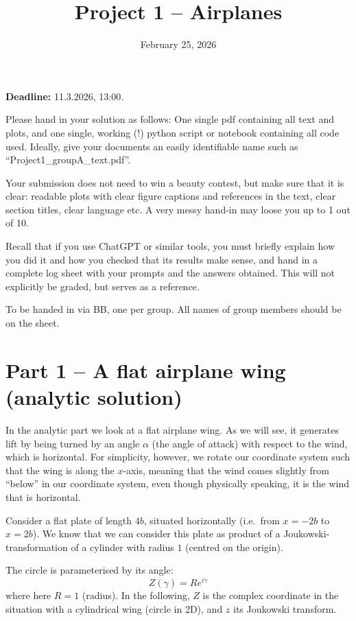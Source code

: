 \documentclass[11pt,a4paper]{article}
\title{Project 1 -- Airplanes}
\date{February 25, 2026}
\begin{document}
\maketitle

\noindent
\textbf{Deadline:} 11.3.2026, 13:00.

\vspace{0.5em}

Please hand in your solution as follows: One single pdf containing all text and plots, and one single, working (!)
python script or notebook containing all code used. Ideally, give your documents an easily identifiable name such as
``Project1\_groupA\_text.pdf''.

Your submission does not need to win a beauty contest, but make sure that it is clear:
readable plots with clear figure captions and references in the text, clear section titles, clear language etc.
A very messy hand-in may loose you up to 1 out of 10.

Recall that if you use ChatGPT or similar tools, you must briefly explain how you did it and how you checked that its
results make sense, and hand in a complete log sheet with your prompts and the answers obtained.
This will not explicitly be graded, but serves as a reference.

To be handed in via BB, one per group. All names of group members should be on the sheet.

\section*{Part 1 -- A flat airplane wing (analytic solution)}

In the analytic part we look at a flat airplane wing. As we will see, it generates lift by being turned by an angle $\alpha$
(the angle of attack) with respect to the wind, which is horizontal. For simplicity, however, we rotate our coordinate
system such that the wing is along the $x$-axis, meaning that the wind comes slightly from ``below'' in our coordinate
system, even though physically speaking, it is the wind that is horizontal.

Consider a flat plate of length $4b$, situated horizontally (i.e.\ from $x=-2b$ to $x=2b$).
We know that we can consider this plate as product of a Joukowski-transformation of a cylinder with radius $1$
(centred on the origin).

The circle is parameterised by its angle:
\[
Z(\gamma) = R e^{i\gamma}
\]
where here $R=1$ (radius). In the following, $Z$ is the complex coordinate in the situation with a cylindrical wing
(circle in 2D), and $z$ its Joukowski transform.
\end{document}
